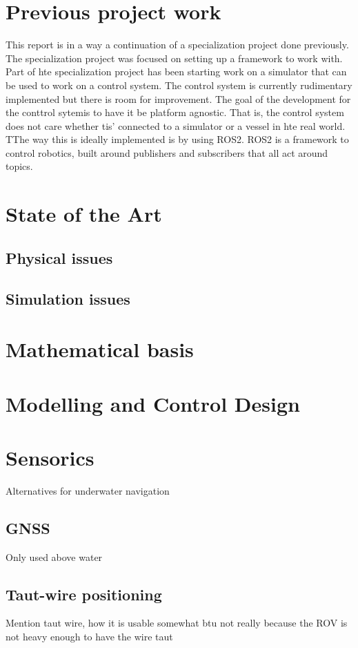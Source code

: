 \documentclass[class=article, crop=false, draft=true]{standalone}
\begin{document}
\section{Previous project work}
This report is in a way a continuation of a specialization project\cite{specialization} done previously. The specialization project was focused on setting up a framework to work with. Part of hte specialization project has been starting work on a simulator that can be used to work on a control system. The control system is currently rudimentary implemented but there is room for improvement. The goal of the development for the conttrol sytemis to have it be platform agnostic. That is, the control system does not care whether tis' connected to a simulator or a vessel in hte real world. TThe way this is ideally implemented is by using ROS2. ROS2 is a framework to control robotics, built around publishers and subscribers that all act around topics.



\section{State of the Art}
\subsection{Physical issues}
\subsection{Simulation issues}

\section{Mathematical basis}

\section{Modelling and Control Design}

\section{Sensorics}
Alternatives for underwater navigation
\subsection{GNSS}
Only used above water
\subsection{Taut-wire positioning}
Mention taut wire, how it is usable somewhat btu not really because the ROV is not heavy enough to have the wire taut
\end{document}
